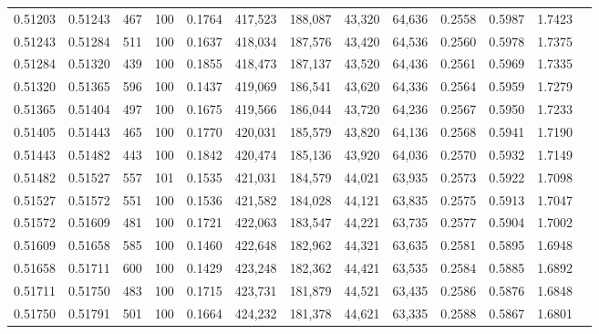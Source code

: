 \begin{tabular}{rrrrrrrrrrrrr}
0.51203 & 0.51243 &   467 & 100 &                                     0.1764 & 417,523 & 188,087 &  43,320 &  64,636 & 0.2558 & 0.5987 & 1.7423 \\
0.51243 & 0.51284 &   511 & 100 &                                     0.1637 & 418,034 & 187,576 &  43,420 &  64,536 & 0.2560 & 0.5978 & 1.7375 \\
0.51284 & 0.51320 &   439 & 100 &                                     0.1855 & 418,473 & 187,137 &  43,520 &  64,436 & 0.2561 & 0.5969 & 1.7335 \\
0.51320 & 0.51365 &   596 & 100 &                                     0.1437 & 419,069 & 186,541 &  43,620 &  64,336 & 0.2564 & 0.5959 & 1.7279 \\
0.51365 & 0.51404 &   497 & 100 &                                     0.1675 & 419,566 & 186,044 &  43,720 &  64,236 & 0.2567 & 0.5950 & 1.7233 \\
0.51405 & 0.51443 &   465 & 100 &                                     0.1770 & 420,031 & 185,579 &  43,820 &  64,136 & 0.2568 & 0.5941 & 1.7190 \\
0.51443 & 0.51482 &   443 & 100 &                                     0.1842 & 420,474 & 185,136 &  43,920 &  64,036 & 0.2570 & 0.5932 & 1.7149 \\
0.51482 & 0.51527 &   557 & 101 &                                     0.1535 & 421,031 & 184,579 &  44,021 &  63,935 & 0.2573 & 0.5922 & 1.7098 \\
0.51527 & 0.51572 &   551 & 100 &                                     0.1536 & 421,582 & 184,028 &  44,121 &  63,835 & 0.2575 & 0.5913 & 1.7047 \\
0.51572 & 0.51609 &   481 & 100 &                                     0.1721 & 422,063 & 183,547 &  44,221 &  63,735 & 0.2577 & 0.5904 & 1.7002 \\
0.51609 & 0.51658 &   585 & 100 &                                     0.1460 & 422,648 & 182,962 &  44,321 &  63,635 & 0.2581 & 0.5895 & 1.6948 \\
0.51658 & 0.51711 &   600 & 100 &                                     0.1429 & 423,248 & 182,362 &  44,421 &  63,535 & 0.2584 & 0.5885 & 1.6892 \\
0.51711 & 0.51750 &   483 & 100 &                                     0.1715 & 423,731 & 181,879 &  44,521 &  63,435 & 0.2586 & 0.5876 & 1.6848 \\
0.51750 & 0.51791 &   501 & 100 &                                     0.1664 & 424,232 & 181,378 &  44,621 &  63,335 & 0.2588 & 0.5867 & 1.6801 \\

\end{tabular}
